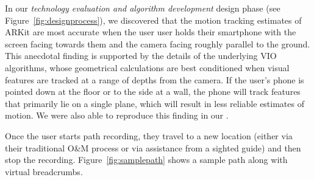 \documentclass[chi_draft]{sigchi}
\newcommand{\OM}{O\&M\xspace}
\begin{document}
In our \emph{technology evaluation and algorithm development} design phase (see Figure~\ref{fig:designprocess}), we discovered that the motion tracking estimates of ARKit are most accurate when the user user holds their smartphone with the screen facing towards them and the camera facing roughly parallel to the ground.  This anecdotal finding is supported by the details of the underlying VIO algorithms, whose  geometrical calculations are best conditioned when visual features are tracked at a range of depths from the camera.  If the user's phone is pointed down at the floor or to the side at a wall, the phone will track features that primarily lie on a single plane, which will result in less reliable estimates of motion.  We were also able to reproduce this finding in our \emph{}.

Once the user starts path recording, they travel to a new location (either via their traditional \OM process or via assistance from a sighted guide) and then stop the recording.  Figure~\ref{fig:samplepath} shows a sample path along with virtual breadcrumbs.
%
\end{document}
